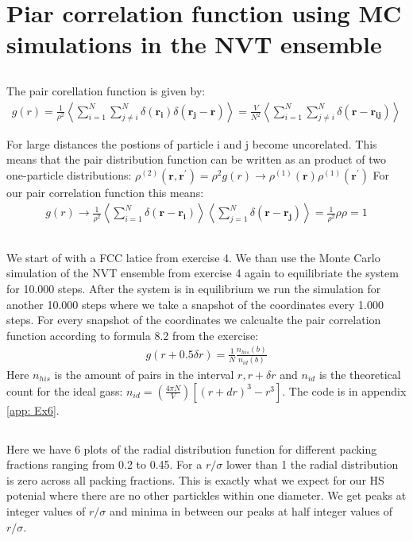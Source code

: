 \section{Piar correlation function using MC simulations in the NVT ensemble}
\subsection{}
The pair corellation function is given by:
\begin{align*}
    g(r)= \frac{1}{\rho^2} \left\langle \sum_{i =1}^{N} \sum_{j \neq i}^{N} \delta(\mathbf{r_i})\delta(\mathbf{r_j - r})\right\rangle = \frac{V}{N^2} \left\langle \sum_{i =1}^{N} \sum_{j \neq i}^{N} \delta(\mathbf{r - r_{ij}})\right\rangle
\end{align*}

For large distances the postions of particle i and j become uncorelated. This means that the pair distribution function can be written as an product of two one-particle distributions: $\rho^{(2)}(\mathbf{r,r^{'}}) = \rho^2 g(r) \rightarrow \rho^{(1)}(\mathbf{r})\rho^{(1)}(\mathbf{r^{'}})$ For our pair correlation function this means:
\begin{align*}
    g(r) \rightarrow \frac{1}{\rho^2} \left\langle \sum_{i =1}^{N}\delta(\mathbf{r-r_i})\right\rangle \left\langle \sum_{j =1}^{N}\delta(\mathbf{r-r_j})\right\rangle = \frac{1}{\rho^2} \rho \rho = 1
\end{align*}
\subsection{}
We start of with a FCC latice from exercise 4. 
We than use the Monte Carlo simulation of the NVT ensemble from exercise 4 again to equilibriate the system for 10.000 steps. 
After the system is in equilibrium we run the simulation for another 10.000 steps where we take a snapshot of the coordinates every 1.000 steps. 
For every snapshot of the coordinates we calcualte the pair correlation function according to formula 8.2 from the exercise:
\begin{align*}
    g(r + 0.5\delta r) = \frac{1}{N} \frac{n_{his}(b)}{n_{id}(b)}
\end{align*}
Here $n_{his}$ is the amount of pairs in the interval $r, r + \delta r$ and $n_{id}$ is the theoretical count for the ideal gass: $n_{id} = \left(\frac{4 \pi N}{V} \right)\left[\left(r + dr \right)^3 -r^3 \right]$.
The code is in appendix \ref{app: Ex6}.
\subsection{}
Here we have 6 plots of the radial distribution function for different packing fractions ranging from 0.2 to 0.45.
For a $r/\sigma$ lower than 1 the radial distribution is zero across all packing fractions. This is exactly what we expect for our HS potenial where there are no other partickles within one diameter.
We get peaks at integer values of $r/\sigma$ and minima in between our peaks at half integer values of  $r/\sigma$.



